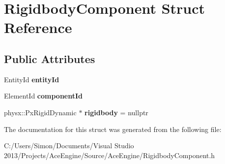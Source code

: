 \hypertarget{struct_rigidbody_component}{}\section{Rigidbody\+Component Struct Reference}
\label{struct_rigidbody_component}
\subsection*{Public Attributes}
\begin{DoxyCompactItemize}
\item 
\hypertarget{struct_rigidbody_component_a6184693037f60b0211a79af3e2a4f665}{}Entity\+Id {\bfseries entity\+Id}\label{struct_rigidbody_component_a6184693037f60b0211a79af3e2a4f665}

\item 
\hypertarget{struct_rigidbody_component_ae388fa1df4240329076321adcd7cbc70}{}Element\+Id {\bfseries component\+Id}\label{struct_rigidbody_component_ae388fa1df4240329076321adcd7cbc70}

\item 
\hypertarget{struct_rigidbody_component_ad3f18bbe51bd85b3bf805ca9aee1ab9a}{}physx\+::\+Px\+Rigid\+Dynamic $\ast$ {\bfseries rigidbody} = nullptr\label{struct_rigidbody_component_ad3f18bbe51bd85b3bf805ca9aee1ab9a}

\end{DoxyCompactItemize}


The documentation for this struct was generated from the following file\+:\begin{DoxyCompactItemize}
\item 
C\+:/\+Users/\+Simon/\+Documents/\+Visual Studio 2013/\+Projects/\+Ace\+Engine/\+Source/\+Ace\+Engine/Rigidbody\+Component.\+h\end{DoxyCompactItemize}
